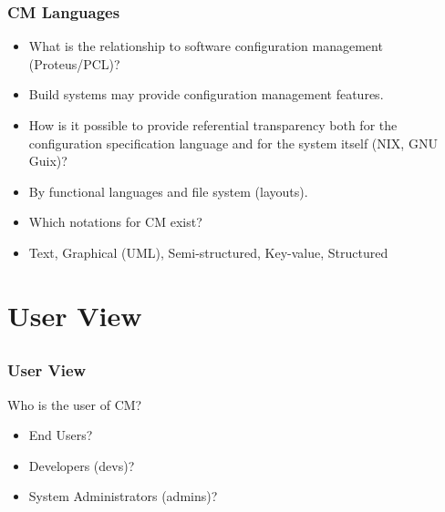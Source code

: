 \begin{frame}
	\frametitle{CM Languages}

	\begin{itemize}[<+-| alert@+>]
	\item What is the relationship to software configuration management (Proteus/PCL)?
	\item[] Build systems may provide configuration management features.
	\item How is it possible to provide referential transparency both for the configuration specification language and for the system itself (NIX, GNU Guix)?
	\item[] By functional languages and file system (layouts).
	\item Which notations for CM exist?
	\item[] Text,  Graphical (UML), Semi-structured, Key-value, Structured
	\end{itemize}
\end{frame}



\section{User View}

\subsection{}

\begin{frame}
	\frametitle{User View}

	Who is the user of CM?

	\begin{itemize}[<+-| alert@+>]
	\item End Users?
	\item Developers (devs)?
	\item System Administrators (admins)?
	\end{itemize}
\end{frame}

